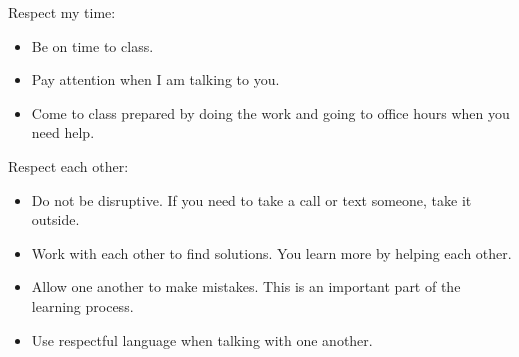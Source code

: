 \documentclass[11pt,letterpaper]{article}
\begin{document}
\newpage


\noindent Respect my time:
\begin{itemize}
\item Be on time to class.
\item Pay attention when I am talking to you.
\item Come to class prepared by doing the work and going to office hours when you need help.
\end{itemize}

\noindent Respect each other:
\begin{itemize}
\item Do not be disruptive. If you need to take a call or text someone, take it outside.
\item Work with each other to find solutions. You learn more by helping each other.
\item Allow one another to make mistakes. This is an important part of the learning process.
\item Use respectful language when talking with one another.
\end{itemize}
\end{document}
